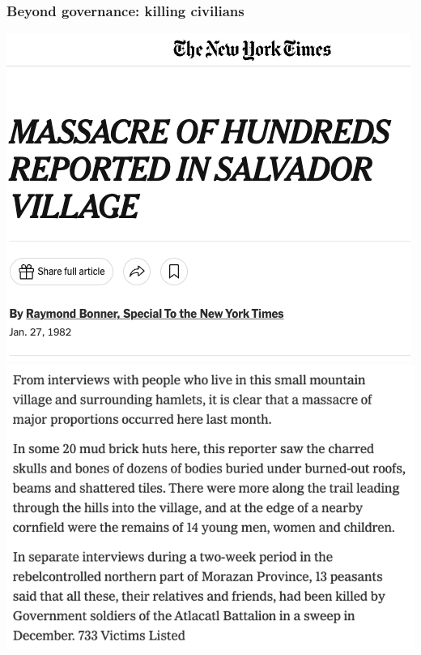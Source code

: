 \documentclass[aspectratio=43]{beamer}
\begin{document}
\begin{frame}
\frametitle{Beyond governance: killing civilians}
\centering

\begin{minipage}{0.49\textwidth}\centering
\includegraphics[width = \textwidth]{img/mozote_nyt1}
\includegraphics[width = \textwidth]{img/mozote_nyt2}
\end{minipage}\hfill
\begin{minipage}{0.49\textwidth}\centering

\end{minipage}
\end{frame}
\end{document}

